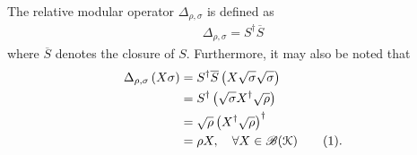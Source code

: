\documentclass[12pt,a4paper,oneside]{article}
\numberwithin{equation}{section}
\theoremstyle{definition}  %
\theoremstyle{plain}  %
\theoremstyle{remark} %
\newcommand{\B}[1]{\mathscr{B}({#1})}
\newcommand{\CK}{\mathcal{K}}
\newcommand{\numberthis}{\refstepcounter{equation}\tag{\theequation}}
\begin{document}
The relative modular operator $\Delta_{\rho,\sigma}$ is defined as \begin{align}
    \label{eq:modular-operator}
    \Delta_{\rho,\sigma} =S^{\dagger}\overline{S}
\end{align}
where $\overline{S}$ denotes the closure of $S$. Furthermore, it may also be noted that 
\begin{align*}\label{eq:modular-operator-action}
    \Delta_{\rho,\sigma} \left(X\sigma\right) &= S^{\dagger}\overline{S}\left(X\sqrt{\sigma}\sqrt{\sigma}\right)\\
    &= S^{\dagger}\left(\sqrt{\sigma}X^{\dagger}\sqrt{\rho}\right)\\
    &= \sqrt{\rho}\left(X^{\dagger}\sqrt{\rho}\right)^\dagger\\
    &=\rho X, \quad \forall X\in \B{\CK }\numberthis.
\end{align*}


\end{document}
